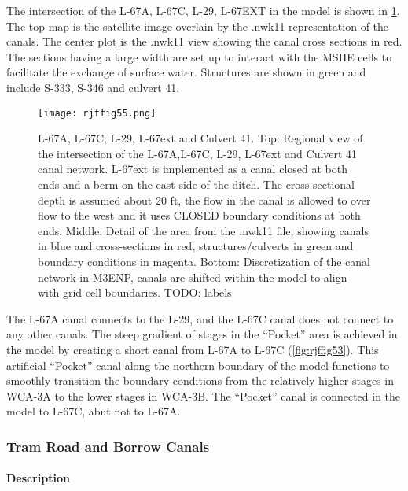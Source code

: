The intersection of the L-67A, L-67C, L-29, L-67EXT in the model is shown in \ref{fig:rjffig55}. The top map is the satellite image overlain by the .nwk11 representation of the canals. The center plot is the .nwk11 view showing the canal cross sections in red. The sections having a large width are set up to interact with the MSHE cells to facilitate the exchange of surface water. Structures are shown in green and include S-333, S-346 and culvert 41.

\begin{figure}[!h]
  \begin{center}
  \texttt{[image: rjffig55.png]}
  \caption[L-67A, L-67C, L-29, L-67ext and Culvert 41.]{L-67A, L-67C, L-29, L-67ext and Culvert 41. Top: Regional view of the intersection of the L-67A,L-67C, L-29, L-67ext and Culvert 41 canal network. L-67ext is implemented as a canal closed at both ends and a berm on the east side of the ditch. The cross sectional depth is assumed about 20 ft, the flow in the canal is allowed to over  flow to the west and it uses CLOSED boundary conditions at both ends.
Middle: Detail of the area from the .nwk11 file, showing canals in blue and cross-sections in red, structures/culverts in green and boundary conditions in magenta.
Bottom: Discretization of the canal network in M3ENP, canals are shifted within the model to align with grid cell boundaries.
TODO: labels}
  \label{fig:rjffig55}
  \end{center}
\end{figure}

The L-67A canal connects to the L-29, and the L-67C canal does not connect to any other canals. The steep gradient of stages in the ``Pocket'' area is achieved in the model by creating a short canal from L-67A to L-67C (\ref{fig:rjffig53}).  This artificial ``Pocket'' canal along the northern boundary of the model functions to smoothly transition the boundary conditions from the relatively higher stages in WCA-3A to the lower stages in WCA-3B.  The ``Pocket'' canal is connected in the model to L-67C, abut not to L-67A.


\clearpage
\subsubsection{Tram Road and Borrow Canals}
\paragraph{Description}

